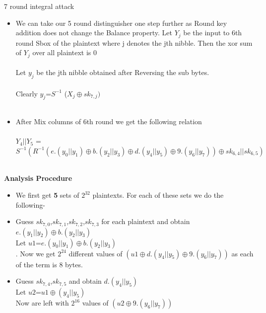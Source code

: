 \begin{frame}{ 7 round integral attack}
	
	\begin{itemize}
	\item We can take our 5 round distinguisher one step further as Round key addition does not change the Balance property. Let $Y_{j}$ be the input to 6th round Sbox of the  plaintext where j denotes the jth nibble. Then the xor sum of $Y_{j}$ over all plaintext is 0 \\
	
	\\
	Let $y_{j}$ be the jth nibble obtained after Reversing the sub bytes.\\ \\ Clearly $y_{j}$=$S^{-1}$ ($X_{j}\oplus sk_{7,j}) $ 
	\\ \\
	\item After Mix columns of 6th round we get the following relation \\ \\
	$Y_{4}||Y_{5}$ = $S^{-1}(R^{-1}(e.(y_{0}||y_{1})\oplus b.(y_{2}||y_{3})\oplus d.(y_{4}||y_{5})\oplus9.(y_{6}|| y_{7}))
	\oplus sk_{6,4} || sk_{6,5})$
	\\ \\
	\end{itemize}
\end{frame}
\begin{frame}
	\textbf{Analysis Procedure}
	\begin{itemize}
		\item We first get \textbf{5} sets of $2^{32}$ plaintexts. For each of these sets we do the following-
		\item Guess $sk_{7,0}$,$sk_{7,1}$,$sk_{7,2}$,$sk_{7,3}$ for each plaintext and obtain $e.(y_{1}||y_{2})\oplus b.(y_{2}||y_{3})$\\
		Let $u1$=$e.(y_{0}||y_{1})\oplus b.(y_{2}||y_{3})$ \\.
		Now we get $2^{24}$ different values of $(u1\oplus d.(y_{4}||y_{5})\oplus9.(y_{6}|| y_{7}))$ as each of the term is 8 bytes.
		
		\item Guess $sk_{7,4}$,$sk_{7,5}$ and obtain 
		$d.(y_{4}||y_{5})$\\
		Let $u2$=$u1 \oplus (y_{4}||y_{5})$  \\  
		Now are left with $2^{16}$ values of $(u2\oplus9.(y_{6}|| y_{7}))$ \\
	\end{itemize}
\end{frame}
